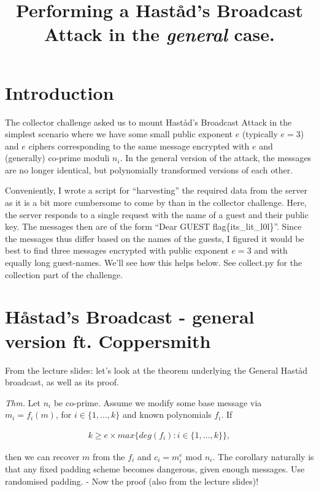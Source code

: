 \documentclass{article}
\title{Performing a Hast{\aa}d's Broadcast Attack in the \emph{general} case.}
\begin{document}
\maketitle

\section{Introduction}

The collector challenge asked us to mount Hast{\aa}d's Broadcast Attack in the simplest scenario where we have some small public exponent $e$ (typically $e=3$) and $e$ ciphers corresponding to the same message encrypted with $e$ and (generally) co-prime moduli $n_i$. In the general version of the attack, the messages are no longer identical, but polynomially transformed versions of each other. \medskip

Conveniently, I wrote a script for ``harvesting'' the required data from the server as it is a bit more cumbersome to come by than in the collector challenge. Here, the server responds to a single request with the name of a guest and their public key. The messages then are of the form ``Dear GUEST flag\{its\_lit\_l0l\}''. 
Since the messages thus differ based on the names of the guests, I figured it would be best to find three messages encrypted with public exponent $e=3$ and with equally long guest-names. We'll see how this helps below. See collect.py for the collection part of the challenge.

\section{H{\aa}stad's Broadcast - general version ft. Coppersmith}

From the lecture slides: let's look at the theorem underlying the General Hast{\aa}d broadcast, as well as its proof.\medskip

\emph{Thm.} Let $n_i$ be co-prime. Assume we modify some base message via $m_i=f_i(m)$, for $i \in \{1,...,k\}$ and known polynomials $f_i$. If 

\begin{align*}
    k \geq e \times max\{deg(f_i): i \in \{1,...,k\}\},
\end{align*}

then we can recover $m$ from the $f_i$ and $c_i=m_i^{e}$ mod $n_i$. The corollary naturally is that any fixed padding scheme becomes dangerous, given enough messages. Use randomised padding. - Now the proof (also from the lecture slides)!\medskip
\end{document}
